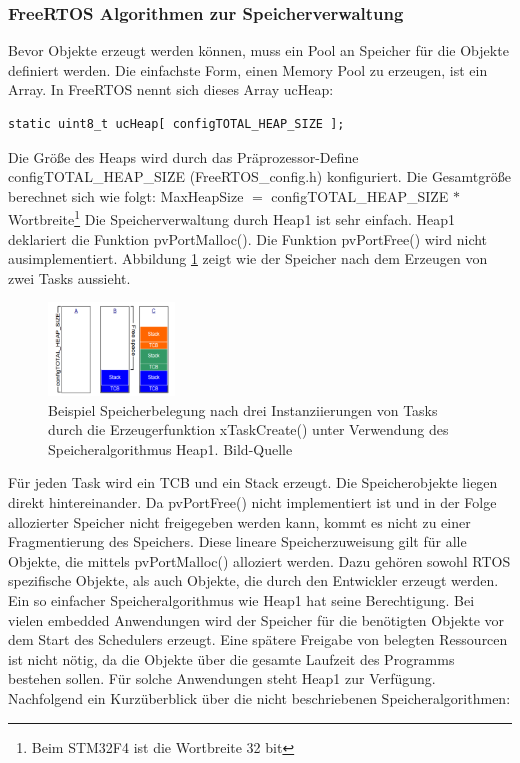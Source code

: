 \subsubsection{FreeRTOS Algorithmen zur Speicherverwaltung}
Bevor Objekte erzeugt werden können, muss ein Pool an Speicher für die Objekte definiert werden. Die einfachste Form, einen Memory Pool zu erzeugen, ist ein Array. In FreeRTOS nennt sich dieses Array ucHeap:
\begin{lstlisting}[numbers = none]
static uint8_t ucHeap[ configTOTAL_HEAP_SIZE ];
\end{lstlisting}
Die Größe des Heaps wird durch das Prä\-pro\-zes\-sor-Define configTOTAL\_HEAP\_SIZE (FreeRTOS\_config.h) konfiguriert. Die Gesamtgröße berechnet sich wie folgt:
\newline
\newline
MaxHeapSize $=$ configTOTAL\_HEAP\_SIZE $\ast$ Wortbreite\footnote{Beim STM32F4 ist die Wortbreite 32 bit} 
\newline
\newline
Die Speicherverwaltung durch Heap1 ist sehr einfach.\newline 
Heap1 deklariert die Funktion pvPortMalloc(). Die Funktion pvPortFree() wird nicht ausimplementiert. Abbildung \ref{fig:Heap1} zeigt wie der Speicher nach dem Erzeugen von zwei Tasks aussieht. 
\begin{figure}[htb]
	\centering
		\includegraphics[width=0.3\textwidth]{Pictures/FreeRTOSOrg/heap1Alg.png}
	\caption{Beispiel Speicherbelegung nach drei Instanziierungen von Tasks durch die Erzeugerfunktion xTaskCreate() unter Verwendung des Speicheralgorithmus Heap1. Bild-Quelle~\protect{}}
	\label{fig:Heap1}
\end{figure}
Für jeden Task wird ein TCB und ein Stack erzeugt. Die Speicherobjekte liegen direkt hintereinander. Da pvPortFree() nicht implementiert ist und in der Folge allozierter Speicher nicht freigegeben werden kann, kommt es nicht zu einer Fragmentierung des Speichers. Diese lineare Speicherzuweisung gilt für alle Objekte, die mittels pvPortMalloc() alloziert werden. Dazu gehören sowohl RTOS spezifische Objekte, als auch Objekte, die durch den Entwickler erzeugt werden. Ein so einfacher Speicheralgorithmus wie Heap1 hat seine Berechtigung. Bei vielen embedded Anwendungen wird der Speicher für die benötigten Objekte vor dem Start des Schedulers erzeugt. Eine spätere Freigabe von belegten Ressourcen ist nicht nötig, da die Objekte über die gesamte Laufzeit des Programms bestehen sollen. Für solche Anwendungen steht Heap1 zur Verfügung. Nachfolgend ein Kurz\-über\-blick über die nicht beschriebenen Speicheralgorithmen:  
